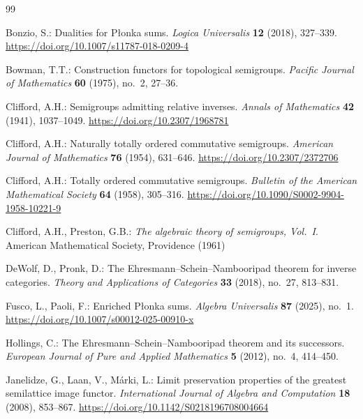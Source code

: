 \documentclass[pdflatex,sn-mathphys-num]{sn-jnl}
\theoremstyle{thmstyleone}%
\theoremstyle{thmstyletwo}%
\theoremstyle{thmstylethree}%
\begin{document}
\begin{thebibliography}{99}

Bonzio, S.:
Dualities for P\l{}onka sums.
\emph{Logica Universalis} \textbf{12} (2018), 327--339.
\newline\url{https://doi.org/10.1007/s11787-018-0209-4}

Bowman, T.T.:
Construction functors for topological semigroups.
\emph{Pacific Journal of Mathematics} \textbf{60} (1975), no.~2, 27--36.

Clifford, A.H.:
Semigroups admitting relative inverses.
\emph{Annals of Mathematics} \textbf{42} (1941), 1037--1049.
\newline\url{https://doi.org/10.2307/1968781}

Clifford, A.H.:
Naturally totally ordered commutative semigroups.
\emph{American Journal of Mathematics} \textbf{76} (1954), 631--646.
\newline\url{https://doi.org/10.2307/2372706}

Clifford, A.H.:
Totally ordered commutative semigroups.
\emph{Bulletin of the American Mathematical Society} \textbf{64} (1958), 305--316.
\newline\url{https://doi.org/10.1090/S0002-9904-1958-10221-9}

Clifford, A.H., Preston, G.B.:
\emph{The algebraic theory of semigroups, Vol.~I}.
American Mathematical Society, Providence (1961)

DeWolf, D., Pronk, D.:
The Ehresmann--Schein--Nambooripad theorem for inverse categories.
\emph{Theory and Applications of Categories} \textbf{33} (2018), no.~27,
813--831.

Fusco, L., Paoli, F.:
Enriched P\l{}onka sums.
\emph{Algebra Universalis} \textbf{87} (2025), no.~1.
\newline\url{https://doi.org/10.1007/s00012-025-00910-x}

Hollings, C.:
The Ehresmann--Schein--Nambooripad theorem and its successors.
\emph{European Journal of Pure and Applied Mathematics} \textbf{5} (2012),
no.~4, 414--450.

Janelidze, G., Laan, V., M\'arki, L.:
Limit preservation properties of the greatest semilattice image functor.
\emph{International Journal of Algebra and Computation} \textbf{18} (2008),
853--867.
\newline\url{https://doi.org/10.1142/S0218196708004664}


\end{thebibliography}
\end{document}
